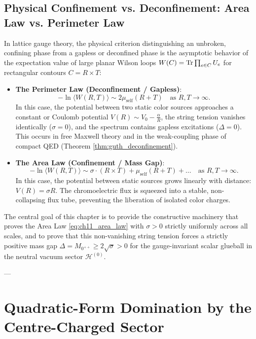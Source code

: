 \subsection{Physical Confinement vs. Deconfinement: Area Law vs. Perimeter Law}
\label{subsec:area_vs_perimeter}

In lattice gauge theory, the physical criterion distinguishing an unbroken, confining phase from a gapless or deconfined phase is the asymptotic behavior of the expectation value of large planar Wilson loops $W(C) = \mathrm{Tr} \prod_{e \in C} U_e$ for rectangular contours $C = R \times T$:
\begin{itemize}
    \item \textbf{The Perimeter Law (Deconfinement / Gapless)}:
    \begin{equation}
    \label{eq:ch11_perimeter_law}
    -\ln \langle W(R, T) \rangle \sim 2 \mu_{\mathrm{self}} (R + T) \quad \text{as } R, T \to \infty.
    \end{equation}
    In this case, the potential between two static color sources approaches a constant or Coulomb potential $V(R) \sim V_0 - \frac{\alpha}{R}$, the string tension vanishes identically ($\sigma = 0$), and the spectrum contains gapless excitations ($\Delta = 0$). This occurs in free Maxwell theory and in the weak-coupling phase of compact QED (Theorem \ref{thm:guth_deconfinement}).
    \item \textbf{The Area Law (Confinement / Mass Gap)}:
    \begin{equation}
    \label{eq:ch11_area_law}
    -\ln \langle W(R, T) \rangle \sim \sigma \cdot (R \times T) + \mu_{\mathrm{self}} (R + T) + \dots \quad \text{as } R, T \to \infty.
    \end{equation}
    In this case, the potential between static sources grows linearly with distance: $V(R) = \sigma R$. The chromoelectric flux is squeezed into a stable, non-collapsing flux tube, preventing the liberation of isolated color charges.
\end{itemize}

The central goal of this chapter is to provide the constructive machinery that proves the Area Law \eqref{eq:ch11_area_law} with $\sigma > 0$ strictly uniformly across all scales, and to prove that this non-vanishing string tension forces a strictly positive mass gap $\Delta = M_{0^{++}} \ge 2\sqrt{\sigma} > 0$ for the gauge-invariant scalar glueball in the neutral vacuum sector $\mathcal{H}^{(0)}$.

---

\section{Quadratic-Form Domination by the Centre-Charged Sector}
\label{sec:quadratic_form_domination}

